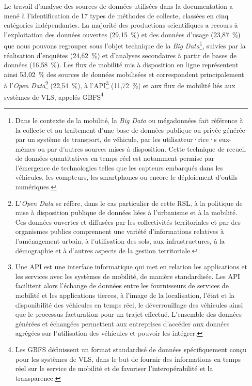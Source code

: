 \begin{refsegment}
Le travail d'analyse des sources de données utilisées dans la documentation a mené à l'identification de 17 types de méthodes de collecte, classées en cinq catégories indépendantes. La majorité des productions scientifiques a recours à l'exploitation des données ouvertes (29,15~\%) et des données d'usage (23,87~\%) que nous pouvons regrouper sous l'objet technique de la \textsl{Big Data}\footnote{
    Dans le contexte de la mobilité, la \textsl{Big Data} ou mégadonnées fait référence à la collecte et au traitement d'une base de données publique ou privée générée par un système de transport, de véhicule, par les utilisateur·rice·s eux-mêmes ou par d'autres sources mises à disposition. Cette technique de recueil de données quantitatives en temps réel est notamment permise par l'émergence de technologies telles que les capteurs embarqués dans les véhicules, les compteurs, les smartphones ou encore le déploiement d'outils numériques.
}, suivies par la réalisation d'enquêtes (24,62~\%) et d'analyses secondaires à partir de bases de données (16,58~\%). Les flux de mobilité mis à disposition en ligne représentent ainsi 53,02~\% des sources de données mobilisées et correspondent principalement à l'\textsl{Open Data}\footnote{
    L'\textsl{Open Data} se réfère, dans le cas particulier de cette \acrshort{RSL}, à la politique de mise à disposition publique de données liées à l'urbanisme et à la mobilité. Ces données ouvertes et diffusées par les collectivités territoriales et par des organismes publics comprennent une variété d'informations relatives à l'aménagement urbain, à l'utilisation des sols, aux infrastructures, à la démographie et à d'autres aspects de la gestion territoriale.
} (22,54~\%), à l'\acrfull{API}\footnote{
    Une \acrshort{API} est une interface informatique qui met en relation les applications et les services avec les systèmes de mobilité, de manière standardisée. Les \acrshort{API} facilitent alors l'échange de données entre les fournisseurs de services de mobilité et les applications tierces, à l'image de la localisation, l'état et la disponibilité des véhicules en temps réel, le déverrouillage des véhicules ainsi que le processus facturation pour un trajet effectué. L'ensemble des données générées et échangées permettent aux entreprises d'accéder aux données agrégées sur l'utilisation des véhicules et pouvoir les intégrer.
} (11,72~\%) et aux flux de mobilité liés aux systèmes de \acrshort{VLS}, appelés \acrfull{GBFS}\footnote{
    Les \acrshort{GBFS} définissent un format standardisé de données spécifiquement conçu pour les systèmes de \acrshort{VLS}, dans le but de fournir des informations en temps réel sur le service de mobilité et de favoriser l'interopérabilité et la transparence.
}
\end{refsegment}
